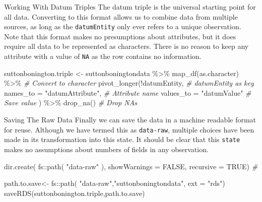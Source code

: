 \documentclass[
  ignorenonframetext,
]{beamer}
\newenvironment{Shaded}{\begin{snugshade}}{\end{snugshade}}
\newcommand{\AttributeTok}[1]{\textcolor[rgb]{0.77,0.63,0.00}{#1}}
\newcommand{\CommentTok}[1]{\textcolor[rgb]{0.56,0.35,0.01}{\textit{#1}}}
\newcommand{\ConstantTok}[1]{\textcolor[rgb]{0.00,0.00,0.00}{#1}}
\newcommand{\FunctionTok}[1]{\textcolor[rgb]{0.00,0.00,0.00}{#1}}
\newcommand{\NormalTok}[1]{#1}
\newcommand{\OtherTok}[1]{\textcolor[rgb]{0.56,0.35,0.01}{#1}}
\newcommand{\SpecialCharTok}[1]{\textcolor[rgb]{0.00,0.00,0.00}{#1}}
\newcommand{\StringTok}[1]{\textcolor[rgb]{0.31,0.60,0.02}{#1}}
\begin{document}
\begin{frame}[fragile]{Working With Datum Triples}
\protect\hypertarget{working-with-datum-triples}{}
The datum triple is the universal starting point for all data.
Converting to this format allows us to combine data from multiple
sources, as long as the \texttt{datumEntity} only ever refers to a
unique observation. Note that this format makes no presumptions about
attributes, but it does require all data to be represented as
characters. There is no reason to keep any attribute with a value of
\texttt{NA} as the row contains no information.

\begin{Shaded}
\begin{Highlighting}[]
\NormalTok{suttonbonington.triple }\OtherTok{\textless{}{-}}\NormalTok{ suttonboningtondata }\SpecialCharTok{\%\textgreater{}\%} 
  \FunctionTok{map\_df}\NormalTok{(as.character) }\SpecialCharTok{\%\textgreater{}\%} \CommentTok{\# Convert to character}
  \FunctionTok{pivot\_longer}\NormalTok{(}\SpecialCharTok{!}\NormalTok{datumEntity, }\CommentTok{\# datumEntity as  key}
  \AttributeTok{names\_to =} \StringTok{"datumAttribute"}\NormalTok{, }\CommentTok{\# Attribute name}
  \AttributeTok{values\_to =} \StringTok{"datumValue"} \CommentTok{\# Save  value}
\NormalTok{      ) }\SpecialCharTok{\%\textgreater{}\%} \FunctionTok{drop\_na}\NormalTok{() }\CommentTok{\# Drop NAs}
\end{Highlighting}
\end{Shaded}
\end{frame}

\begin{frame}[fragile]{Saving The Raw Data}
\protect\hypertarget{saving-the-raw-data}{}
Finally we can save the data in a machine readable format for reuse.
Although we have termed this as \texttt{data-raw}, multiple choices have
been made in its transformation into this state. It should be clear that
this \texttt{state} makes no assumptions about numbers of fields in any
observation.

\begin{Shaded}
\begin{Highlighting}[]
\FunctionTok{dir.create}\NormalTok{( }
\NormalTok{          fs}\SpecialCharTok{::}\FunctionTok{path}\NormalTok{( }
            \StringTok{"data{-}raw"}\NormalTok{ ),  }
            \AttributeTok{showWarnings =} \ConstantTok{FALSE}\NormalTok{,}
            \AttributeTok{recursive =} \ConstantTok{TRUE}\NormalTok{) }\CommentTok{\# }

\NormalTok{path.to.save}\OtherTok{\textless{}{-}}\NormalTok{ fs}\SpecialCharTok{::}\FunctionTok{path}\NormalTok{( }
 \StringTok{"data{-}raw"}\NormalTok{,}\StringTok{"suttonboningtondata"}\NormalTok{, }\AttributeTok{ext =} \StringTok{"rds"}\NormalTok{)}
\FunctionTok{saveRDS}\NormalTok{(suttonbonington.triple,path.to.save)}
\end{Highlighting}
\end{Shaded}
\end{frame}
\end{document}
